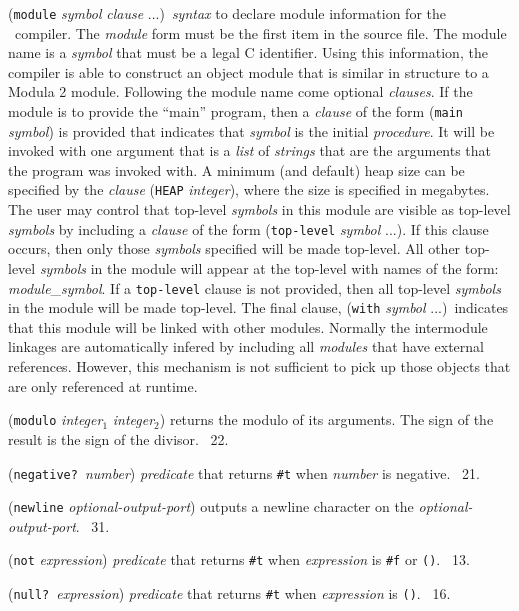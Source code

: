 \documentclass[10pt,twocolumn]{article}
\begin{document}
(\texttt{module} \emph{symbol} \emph{clause} ...)\ \emph{syntax} to
declare module information for the \StoC\ compiler.  The \emph{module}
form must be the first item in the source file.  The module name is a
\emph{symbol} that must be a legal C identifier.  Using this
information, the compiler is able to construct an object module that
is similar in structure to a Modula 2 module. Following the module
name come optional \emph{clauses}. If the module is to provide the
``main'' program, then a \emph{clause} of the form (\texttt{main}
\emph{symbol}) is provided that indicates that \emph{symbol} is the
initial \emph{procedure}.  It will be invoked with one argument that
is a \emph{list} of \emph{strings} that are the arguments that the
program was invoked with.  A minimum (and default) heap size can be
specified by the \emph{clause} (\texttt{HEAP} \emph{integer}), where
the size is specified in megabytes.  The user may control that
top-level \emph{symbols} in this module are visible as top-level
\emph{symbols} by including a \emph{clause} of the form
(\texttt{top-level} \emph{symbol} ...). If this clause occurs, then
only those \emph{symbols} specified will be made top-level. All other
top-level \emph{symbols} in the module will appear at the top-level
with names of the form: \emph{module}\_\emph{symbol}.  If a
\texttt{top-level} clause is not provided, then all top-level
\emph{symbols} in the module will be made top-level. The final clause,
(\texttt{with} \emph{symbol} ...)\ indicates that this module will be
linked with other modules.  Normally the intermodule linkages are
automatically infered by including all \emph{modules} that have
external references. However, this mechanism is not sufficient to pick
up those objects that are only referenced at runtime.

(\texttt{modulo} \emph{integer}$_1$ \emph{integer}$_2$) returns the
modulo of its arguments.  The sign of the result is the sign of the
divisor.  \RRRRRS~22.

(\texttt{negative?}\ \emph{number}) \emph{predicate} that returns
\texttt{\#t} when \emph{number} is negative.  \RRRRRS~21.

(\texttt{newline} \emph{optional-output-port}) outputs a newline
character on the \emph{optional-output-port}.  \RRRRRS~31.

(\texttt{not} \emph{expression}) \emph{predicate} that returns
\texttt{\#t} when \emph{expression} is \texttt{\#f} or \texttt{()}.
\RRRRRS~13.

(\texttt{null?}\ \emph{expression}) \emph{predicate} that returns
\texttt{\#t} when \emph{expression} is \texttt{()}.  \RRRRRS~16.
\end{document}
